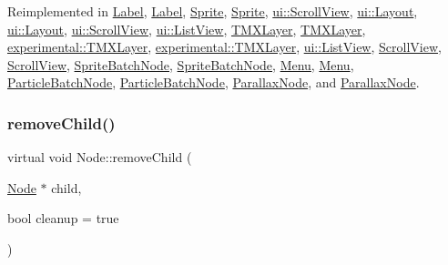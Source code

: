Reimplemented in \hyperlink{classLabel_adbd0b3a732d798e37ee50faa99453647}{Label}, \hyperlink{classLabel_a2fc940a01f34e1ea809bb09e1f82575f}{Label}, \hyperlink{classSprite_a84cbb6f523e114e8d5c5767ec7796111}{Sprite}, \hyperlink{classSprite_a64aee8360870f15193ad46565565a0f2}{Sprite}, \hyperlink{classui_1_1ScrollView_ae3b50790cd7fa0feeacc9204fe86fc1a}{ui\+::\+Scroll\+View}, \hyperlink{classui_1_1Layout_a3a391ace9855a825523cdc882c271abe}{ui\+::\+Layout}, \hyperlink{classui_1_1Layout_a13d675c669b6b926956baf484ce0857a}{ui\+::\+Layout}, \hyperlink{classui_1_1ScrollView_a678108e716966e8beccc25c0de1d9b29}{ui\+::\+Scroll\+View}, \hyperlink{classui_1_1ListView_ace4890246e03a8de66cfe9d0312df365}{ui\+::\+List\+View}, \hyperlink{classTMXLayer_abaf25490e1f7807816c07167a8d4af46}{T\+M\+X\+Layer}, \hyperlink{classTMXLayer_abaf25490e1f7807816c07167a8d4af46}{T\+M\+X\+Layer}, \hyperlink{classexperimental_1_1TMXLayer_a13544208580495a457a7ec1f2da9a4d1}{experimental\+::\+T\+M\+X\+Layer}, \hyperlink{classexperimental_1_1TMXLayer_ade60657de43636151aef237010b2965b}{experimental\+::\+T\+M\+X\+Layer}, \hyperlink{classui_1_1ListView_a7002fe4ad783aeccf56cebbe4144036e}{ui\+::\+List\+View}, \hyperlink{classScrollView_a10009c987a878297cabe629369142972}{Scroll\+View}, \hyperlink{classScrollView_a678108e716966e8beccc25c0de1d9b29}{Scroll\+View}, \hyperlink{classSpriteBatchNode_a918786ec36ffac4169444d478e455c5c}{Sprite\+Batch\+Node}, \hyperlink{classSpriteBatchNode_a7bebdfd28805ed83d0a78b49f8b52803}{Sprite\+Batch\+Node}, \hyperlink{classMenu_ab08cab6e153f4d7fabf06cbc941c8c58}{Menu}, \hyperlink{classMenu_a671c3f506ddcf0532144056289721540}{Menu}, \hyperlink{classParticleBatchNode_a384b404f2f29463180517528f6f350dc}{Particle\+Batch\+Node}, \hyperlink{classParticleBatchNode_a44ecab9f55fdf0196cb40fd39781bea6}{Particle\+Batch\+Node}, \hyperlink{classParallaxNode_a0ce03b1f03d63885b0ffae5a17662f45}{Parallax\+Node}, and \hyperlink{classParallaxNode_ae7a8f0dc0855dd89ac16bc4bd3f55621}{Parallax\+Node}.

\mbox{\label{classNode_ae2e85ab2de9e93e3998a40df1b4b61fc}} 
\subsubsection{\texorpdfstring{remove\+Child()}{removeChild()}\hspace{0.1cm}{\footnotesize\ttfamily [2/2]}}
{\footnotesize\ttfamily virtual void Node\+::remove\+Child (\begin{DoxyParamCaption}\item[{\hyperlink{classNode}{Node} $\ast$}]{child,  }\item[{bool}]{cleanup = {\ttfamily true} }\end{DoxyParamCaption})\hspace{0.3cm}{\ttfamily [virtual]}}

